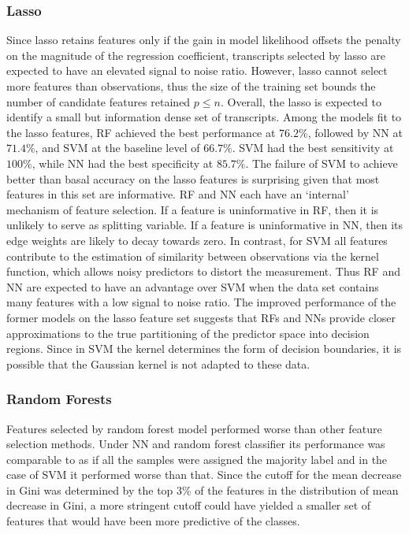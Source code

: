 \documentclass[a4paper]{article}
\begin{document}
\subsubsection{Lasso}

Since lasso retains features only if the gain in model likelihood offsets the penalty on the magnitude of the regression coefficient, transcripts selected by lasso are expected to have an elevated signal to noise ratio. However, lasso cannot select more features than observations, thus the size of the training set bounds the number of candidate features retained $p \leq n$. Overall, the lasso is expected to identify a small but information dense set of transcripts. Among the models fit to the lasso features, RF achieved the best performance at $76.2\%$, followed by NN at $71.4\%$, and SVM at the baseline level of $66.7\%$. SVM had the best sensitivity at $100\%$, while NN had the best specificity at $85.7\%$. The failure of SVM to achieve better than basal accuracy on the lasso features is surprising given that most features in this set are informative. RF and NN each have an `internal' mechanism of feature  selection. If a feature is uninformative in RF, then it is unlikely to serve as splitting variable. If a feature is uninformative in NN, then its edge weights are likely to decay towards zero. In contrast, for SVM all features contribute to the estimation of similarity between observations via the kernel function, which allows noisy predictors to distort the measurement. Thus RF and NN are expected to have an advantage over SVM when the data set contains many features with a low signal to noise ratio. The improved performance of the former models on the lasso feature set suggests that RFs and NNs provide closer approximations to the true partitioning of the predictor space into decision regions. Since in SVM the kernel determines the form of decision boundaries, it is possible that the Gaussian kernel is not adapted to these data.  

\subsubsection{Random Forests}
Features selected by random forest model performed worse than other feature selection methods. Under NN and random forest classifier its performance was comparable to as if all the samples were assigned the majority label and in the case of SVM it performed worse than that. Since the cutoff for the mean decrease in Gini was determined by the top 3\% of the features in the distribution of mean decrease in Gini, a more stringent cutoff could have yielded a smaller set of features that would have been more predictive of the classes.  
\end{document}
